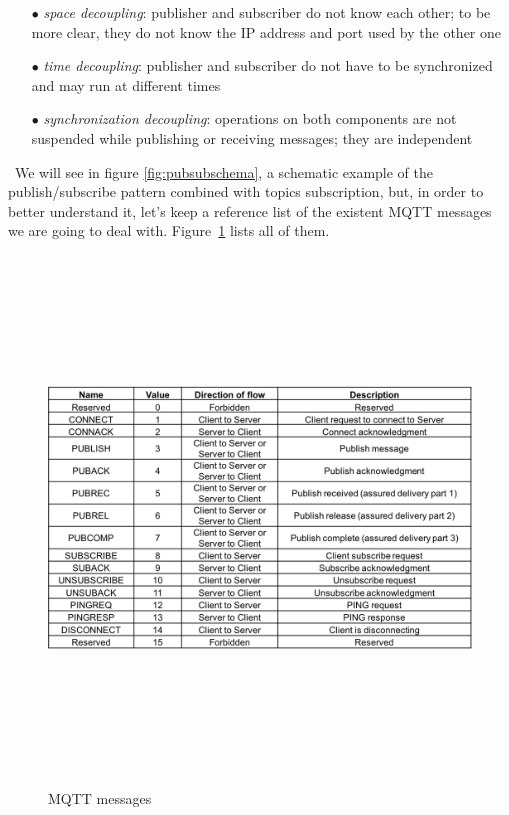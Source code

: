 \documentclass[12pt]{report}
\begin{document}
{\begin{itemize}
  \setlength{\itemindent}{+4mm}
  \item[$\bullet$] \emph{space decoupling}: publisher and subscriber do not know each other; to be more clear, they do not know the IP address and port used by the other one
  \item[$\bullet$] \emph{time decoupling}: publisher and subscriber do not have to be synchronized and may run at different times
  \item[$\bullet$] \emph{synchronization decoupling}: operations on both components are not suspended while publishing or receiving messages; they are independent
\end{itemize}\
We will see in figure \ref{fig:pubsubschema}, a schematic  example of the publish/subscribe pattern combined with topics subscription, but, in order to better understand it, let's keep a reference list of the existent MQTT messages we are going to deal with. Figure~\ref{fig:mqttmsgs} lists all of them.


\begin{figure}[H]
\includegraphics[width=14cm,height=14cm,keepaspectratio]{mqtt_messages}
\centering
\caption{MQTT messages}
\label{fig:mqttmsgs}
\end{figure}

}
\end{document}
